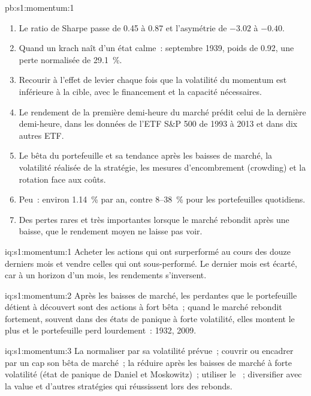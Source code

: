 \begin{solution}{pb:s1:momentum:1}
\begin{enumerate}
a perdu 16.8~\% (16.5~\%).
\item Le ratio de Sharpe passe de 0.45 à 0.87 et l'asymétrie de $-3.02$ à $-0.40$.
\item Quand un krach naît d'un état calme~: septembre 1939, poids de 0.92, une perte normalisée de 29.1~\%.
\item Recourir à l'effet de levier chaque fois que la volatilité du momentum est inférieure à la cible, avec le financement et la capacité nécessaires.
\item Le rendement de la première demi-heure du marché prédit celui de la dernière demi-heure, dans les données de l'ETF S\&P 500 de 1993 à 2013 et dans dix autres ETF.
\item Le bêta du portefeuille et sa tendance après les baisses de marché, la volatilité réalisée de la stratégie, les mesures d'encombrement (crowding) et la rotation face aux coûts.
\item Peu~: environ 1.14~\% par an, contre 8--38~\% pour les portefeuilles quotidiens.
\item Des pertes rares et très importantes lorsque le marché rebondit après une baisse, que le rendement moyen ne laisse pas voir.
\end{enumerate}
\end{solution}

\begin{solution}{iq:s1:momentum:1}
Acheter les actions qui ont surperformé au cours des douze derniers mois et vendre celles qui ont sous-performé. Le dernier mois est écarté, car à un horizon
d'un mois, les rendements s'inversent.
\end{solution}

\begin{solution}{iq:s1:momentum:2}
Après les baisses de marché, les perdantes que le portefeuille détient à découvert sont des actions à fort bêta~; quand le marché rebondit fortement, souvent dans des états de panique à forte volatilité, elles montent
le plus et le portefeuille perd lourdement~: 1932, 2009.
\end{solution}

\begin{solution}{iq:s1:momentum:3}
La normaliser par sa volatilité prévue~; couvrir ou encadrer par un cap son bêta de marché~; la réduire après les baisses de marché à forte volatilité (état de panique de Daniel et Moskowitz)~;
utiliser le ~; diversifier avec la value et d'autres stratégies qui réussissent lors des rebonds.
\end{solution}


